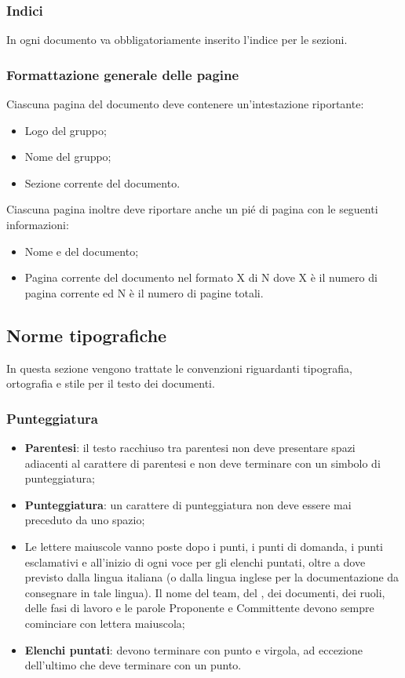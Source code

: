   \subsubsection{Indici}
  In ogni documento va obbligatoriamente inserito l'indice per le sezioni. 

  \subsubsection{Formattazione generale delle pagine}
  Ciascuna pagina del documento deve contenere un'intestazione riportante:
  \begin{itemize}
  \item Logo del gruppo;
  \item Nome del gruppo;
  \item Sezione corrente del documento.
  \end{itemize}
  Ciascuna pagina inoltre deve riportare anche un pi\'e di pagina con le seguenti informazioni:
  \begin{itemize}
  \item Nome e  del documento;
  \item Pagina corrente del documento nel formato X di N dove X è il numero di pagina corrente ed N è il numero di pagine totali.
  \end{itemize}

\subsection{Norme tipografiche}
In questa sezione vengono trattate le convenzioni riguardanti tipografia, ortografia e stile per il testo dei documenti.
\subsubsection{Punteggiatura}
\begin{itemize}
\item \textbf{Parentesi}: il testo racchiuso tra parentesi non deve presentare spazi adiacenti al carattere di parentesi e non deve terminare con un simbolo di punteggiatura;
\item \textbf{Punteggiatura}: un carattere di punteggiatura non deve essere mai preceduto da uno spazio;
\item Le lettere maiuscole vanno poste dopo i punti, i punti di domanda, i punti esclamativi e all'inizio di ogni voce per gli elenchi puntati, oltre a dove previsto dalla lingua italiana (o dalla lingua inglese per la documentazione da consegnare in tale lingua). Il nome del team, del , dei documenti, dei ruoli, delle fasi di lavoro e le parole Proponente e Committente devono sempre cominciare con lettera maiuscola;
  \item \textbf{Elenchi puntati}: devono terminare con punto e virgola, ad eccezione dell'ultimo che deve terminare con un punto.
\end{itemize}

